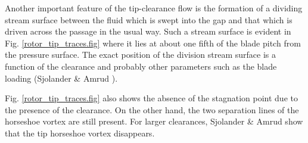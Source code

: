  Another important feature of the tip-clearance flow
 is the formation of a dividing stream surface between the fluid which is swept
 into the gap and that which is driven across the passage in the usual way.
 Such a stream surface is evident in Fig. \ref{rotor_tip_traces.fig}
 where it lies at about one fifth of the blade pitch from the pressure
 surface. The exact position of the division stream surface is a function
 of the clearance and probably other parameters such as the blade loading
 (Sjolander \& Amrud ).

 Fig. \ref{rotor_tip_traces.fig} also shows the absence of the
 stagnation point due to the presence of the clearance.
 On the other hand, the two separation lines of the horseshoe
 vortex are still present.
 For larger clearances, Sjolander \& Amrud \citeyear{Sjolander:1} show
 that the tip horseshoe vortex disappears.
%
%
%
